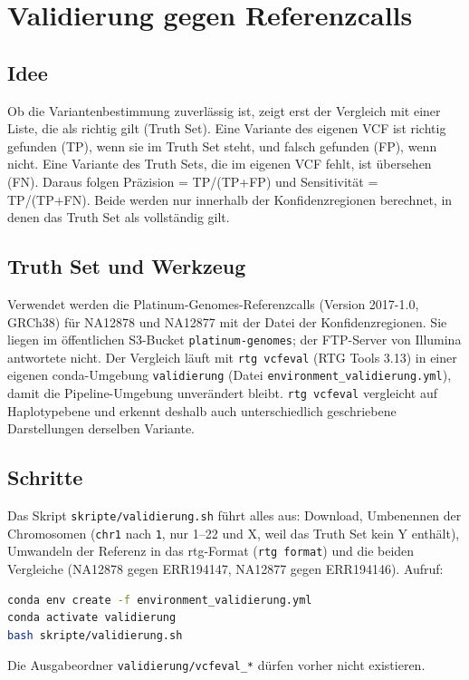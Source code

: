 \documentclass[10pt,a4paper,twocolumn]{article}
\begin{document}
\section{Validierung gegen Referenzcalls}
\subsection{Idee}
Ob die Variantenbestimmung zuverlässig ist, zeigt erst der Vergleich mit einer Liste, die als richtig gilt (Truth Set). Eine Variante des eigenen VCF ist richtig gefunden (TP), wenn sie im Truth Set steht, und falsch gefunden (FP), wenn nicht. Eine Variante des Truth Sets, die im eigenen VCF fehlt, ist übersehen (FN). Daraus folgen Präzision = TP/(TP+FP) und Sensitivität = TP/(TP+FN). Beide werden nur innerhalb der Konfidenzregionen berechnet, in denen das Truth Set als vollständig gilt.

\subsection{Truth Set und Werkzeug}
Verwendet werden die Platinum-Genomes-Referenzcalls (Version 2017-1.0, GRCh38) für NA12878 und NA12877 \citep{eberle2017} mit der Datei der Konfidenzregionen. Sie liegen im öffentlichen S3-Bucket \texttt{platinum-genomes}; der FTP-Server von Illumina antwortete nicht. Der Vergleich läuft mit \texttt{rtg vcfeval} (RTG Tools 3.13) in einer eigenen conda-Umgebung \texttt{validierung} (Datei \texttt{environment\_validierung.yml}), damit die Pipeline-Umgebung unverändert bleibt. \texttt{rtg vcfeval} vergleicht auf Haplotypebene und erkennt deshalb auch unterschiedlich geschriebene Darstellungen derselben Variante.

\subsection{Schritte}
Das Skript \texttt{skripte/validierung.sh} führt alles aus: Download, Umbenennen der Chromosomen (\texttt{chr1} nach \texttt{1}, nur 1--22 und X, weil das Truth Set kein Y enthält), Umwandeln der Referenz in das rtg-Format (\texttt{rtg format}) und die beiden Vergleiche (NA12878 gegen ERR194147, NA12877 gegen ERR194146). Aufruf:
\begin{lstlisting}[language=bash,basicstyle=\ttfamily\small]
conda env create -f environment_validierung.yml
conda activate validierung
bash skripte/validierung.sh
\end{lstlisting}
Die Ausgabeordner \texttt{validierung/vcfeval\_*} dürfen vorher nicht existieren.
\end{document}
